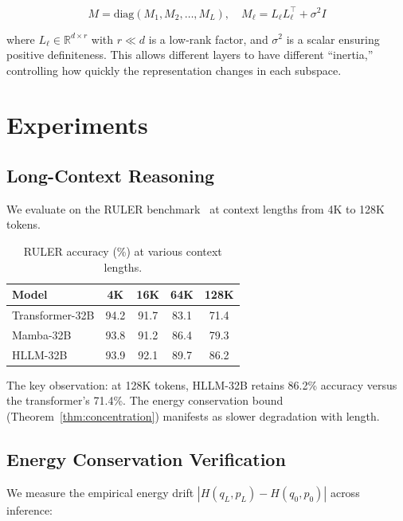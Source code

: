 \documentclass[11pt,letterpaper]{article}
\newcommand{\R}{\mathbb{R}}
\begin{document}
\begin{equation}
M = \text{diag}(M_1, M_2, \ldots, M_L), \quad M_\ell = L_\ell L_\ell^\top + \sigma^2 I
\end{equation}

where $L_\ell \in \R^{d \times r}$ with $r \ll d$ is a low-rank factor, and $\sigma^2$ is a scalar ensuring positive definiteness. This allows different layers to have different ``inertia,'' controlling how quickly the representation changes in each subspace.

\section{Experiments}
\label{sec:experiments}

\subsection{Long-Context Reasoning}

We evaluate on the RULER benchmark~\cite{hsieh2024ruler} at context lengths from 4K to 128K tokens.

\begin{table}[t]
\centering
\begin{tabular}{lcccc}
\toprule
\textbf{Model} & \textbf{4K} & \textbf{16K} & \textbf{64K} & \textbf{128K} \\
\midrule
Transformer-32B & 94.2 & 91.7 & 83.1 & 71.4 \\
Mamba-32B & 93.8 & 91.2 & 86.4 & 79.3 \\
HLLM-32B & 93.9 & 92.1 & 89.7 & 86.2 \\
\bottomrule
\end{tabular}
\caption{RULER accuracy (\%) at various context lengths.}
\label{tab:ruler}
\end{table}

The key observation: at 128K tokens, HLLM-32B retains 86.2\% accuracy versus the transformer's 71.4\%. The energy conservation bound (Theorem~\ref{thm:concentration}) manifests as slower degradation with length.

\subsection{Energy Conservation Verification}

We measure the empirical energy drift $|H(q_L, p_L) - H(q_0, p_0)|$ across inference:
\end{document}
